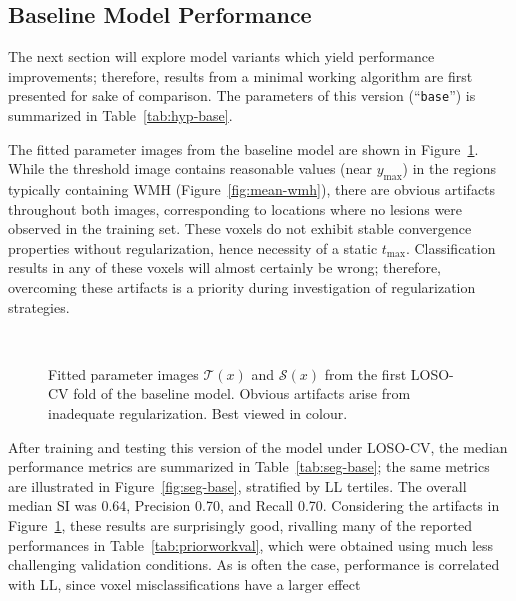 \subsection{Baseline Model Performance}\label{ss:exp-base}
The next section will explore model variants which yield performance improvements;
therefore, results from a minimal working algorithm are first presented for sake of comparison.
The parameters of this version (``\texttt{base}'') is summarized in Table~\ref{tab:hyp-base}.
\par
The fitted parameter images from the baseline model
are shown in Figure~\ref{fig:beta-base}.
While the threshold image contains reasonable values (near $y_{\max}$)
in the regions typically containing WMH (Figure~\ref{fig:mean-wmh}),
there are obvious artifacts throughout both images,
corresponding to locations where no lesions were observed in the training set.
These voxels do not exhibit stable convergence properties without regularization,
hence necessity of a static $t_{\max}$.
Classification results in any of these voxels will almost certainly be wrong;
therefore, overcoming these artifacts is a priority
during investigation of regularization strategies.
\par
\begin{figure}
  \centering
  \\[0.5em]
  \caption{Fitted parameter images $\mathcal{T}(x)$ and $\mathcal{S}(x)$
    from the first LOSO-CV fold of the baseline model.
    Obvious artifacts arise from inadequate regularization.
    Best viewed in colour.}%
  \label{fig:beta-base}
\end{figure}
After training and testing this version of the model under LOSO-CV,
the median performance metrics are summarized in Table~\ref{tab:seg-base};
the same metrics are illustrated in Figure~\ref{fig:seg-base}, stratified by LL tertiles.
The overall median SI was 0.64, Precision 0.70, and Recall 0.70.
Considering the artifacts in Figure~\ref{fig:beta-base},
these results are surprisingly good,
rivalling many of the reported performances in Table~\ref{tab:priorworkval},
which were obtained using much less challenging validation conditions.
As is often the case, performance is correlated with LL,
since voxel misclassifications have a larger effect
